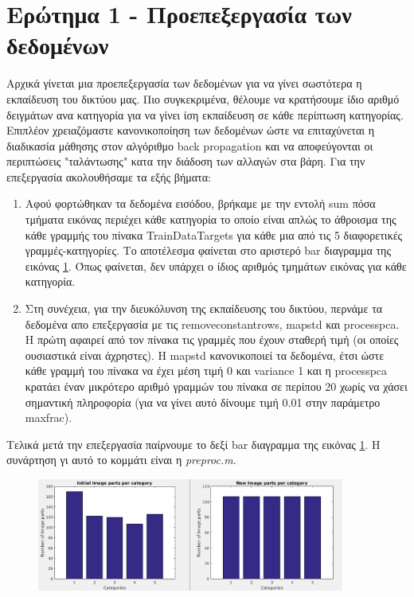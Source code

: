\documentclass[12pt]{article}
\begin{document}
\section*{Ερώτημα 1 - Προεπεξεργασία των δεδομένων}
	Αρχικά γίνεται μια προεπεξεργασία των δεδομένων για να γίνει σωστότερα η εκπαίδευση του δικτύου μας. Πιο συγκεκριμένα, θέλουμε να κρατήσουμε ίδιο αριθμό δειγμάτων ανα κατηγορία για να γίνει ίση εκπαίδευση σε κάθε περίπτωση κατηγορίας. Επιπλέον χρειαζόμαστε κανονικοποίηση των δεδομένων ώστε να επιταχύνεται η διαδικασία μάθησης στον αλγόριθμο back propagation και να αποφεύγονται οι περιπτώσεις "ταλάντωσης" κατα την διάδοση των αλλαγών στα βάρη. Για την επεξεργασία ακολουθήσαμε τα εξής βήματα:
	\begin{enumerate}
		\item Αφού φορτώθηκαν τα δεδομένα εισόδου, βρήκαμε με την εντολή sum πόσα τμήματα εικόνας περιέχει κάθε κατηγορία το οποίο είναι απλώς το άθροισμα της κάθε γραμμής του πίνακα TrainDataTargets για κάθε μια από τις 5 διαφορετικές γραμμές-κατηγορίες. Το αποτέλεσμα φαίνεται στο αριστερό bar διαγραμμα της εικόνας \ref{fig:2.1-parts-per-cat}. Όπως φαίνεται, δεν υπάρχει ο ίδιος αριθμός τμημάτων εικόνας για κάθε κατηγορία.
		\item Στη συνέχεια, για την διευκόλυνση της εκπαίδευσης του δικτύου, περνάμε τα δεδομένα απο επεξεργασία με τις removeconstantrows, mapstd και processpca. Η πρώτη αφαιρεί από τον πίνακα τις γραμμές που έχουν σταθερή τιμή (οι οποίες ουσιαστικά είναι άχρηστες). Η mapstd κανονικοποιεί τα δεδομένα, έτσι ώστε κάθε γραμμή του πίνακα να έχει μέση τιμή 0 και variance 1 και η processpca  κρατάει έναν μικρότερο αριθμό γραμμών του πίνακα σε περίπου 20 χωρίς να χάσει σημαντική πληροφορία (για να γίνει αυτό δίνουμε τιμή 0.01 στην παράμετρο maxfrac).
	\end{enumerate}
	Τελικά μετά την επεξεργασία παίρνουμε το δεξί bar διαγραμμα της εικόνας \ref{fig:2.1-parts-per-cat}. Η συνάρτηση γι αυτό το κομμάτι είναι η \textit{preproc.m}.
	
		\begin{figure}[H]
	 		\centering
			\includegraphics[width=0.9\textwidth]{fakelos/parts-per-cat.png}
			\caption{} 	  
			\label{fig:2.1-parts-per-cat}
		\end{figure}
\end{document}
